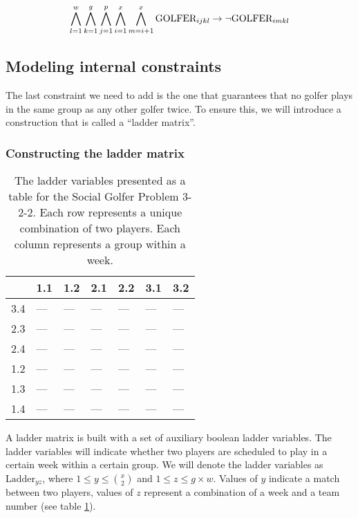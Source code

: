\documentclass[a4paper]{scrartcl}
\begin{document}
\begin{equation}
\centering
    \bigwedge \limits_{l=1}^w 
    \bigwedge \limits_{k=1}^g 
    \bigwedge \limits_{j=1}^p
    \bigwedge \limits_{i=1}^x 
    \bigwedge \limits_{m=i+1}^x 
    \text{GOLFER}_{ijkl} 
    \to
    \neg \text{GOLFER}_{imkl}
\end{equation}


\subsection{Modeling internal constraints}

The last constraint we need to add is the one that guarantees that no golfer plays in the same group as any other golfer twice. To ensure this, we will introduce a construction that is called a ``ladder matrix''.


\subsubsection{Constructing the ladder matrix}

\begin{table}[h]
\centering
\label{ladder:example}
\begin{tabular}{ l | l | l | l | l | l | l }

    & 1.1 & 1.2 & 2.1 & 2.2 & 3.1 & 3.2 \\
\hline
3.4 & --- & --- & --- & --- & --- & --- \\
2.3 & --- & --- & --- & --- & --- & --- \\
2.4 & --- & --- & --- & --- & --- & --- \\
1.2 & --- & --- & --- & --- & --- & --- \\
1.3 & --- & --- & --- & --- & --- & --- \\
1.4 & --- & --- & --- & --- & --- & --- \\

\end{tabular}
\caption{The ladder variables presented as a table for the Social Golfer Problem 3-2-2. Each row represents a unique combination of two players. Each column represents a group within a week.}
\end{table}

A ladder matrix is built with a set of auxiliary boolean ladder variables. The ladder variables will indicate whether two players are scheduled to play in a certain week within a certain group. We will denote the ladder variables as $\text{Ladder}_{yz}$, where $1 \leq y \leq {x \choose 2}$ and $1 \leq z \leq g \times w$. Values of $y$ indicate a match between two players, values of $z$ represent a combination of a week and a team number (see table \ref{ladder:example}). 
\end{document}
